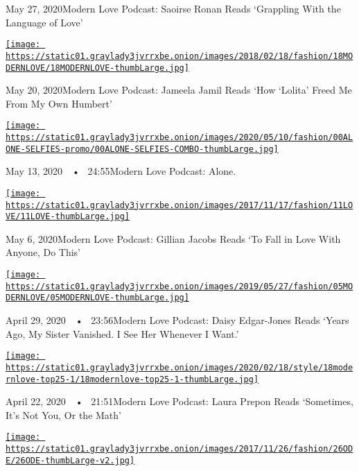 May 27, 2020Modern Love Podcast: Saoirse Ronan Reads `Grappling With the
Language of Love'

\href{https://www.nytimes3xbfgragh.onion/2020/05/20/style/modern-love-podcast-jameela-jamil.html?action=click\&module=audio-series-bar\&region=header\&pgtype=Article}{\texttt{[image: https://static01.graylady3jvrrxbe.onion/images/2018/02/18/fashion/18MODERNLOVE/18MODERNLOVE-thumbLarge.jpg]}}

May 20, 2020Modern Love Podcast: Jameela Jamil Reads `How `Lolita' Freed
Me From My Own Humbert'

\href{https://www.nytimes3xbfgragh.onion/2020/05/13/style/modern-love-podcast-coronavirus-living-alone.html?action=click\&module=audio-series-bar\&region=header\&pgtype=Article}{\texttt{[image: https://static01.graylady3jvrrxbe.onion/images/2020/05/10/fashion/00ALONE-SELFIES-promo/00ALONE-SELFIES-COMBO-thumbLarge.jpg]}}

May 13, 2020~~•~ 24:55Modern Love Podcast: Alone.

\href{https://www.nytimes3xbfgragh.onion/2020/05/06/style/modern-love-podcast-gillian-jacobs.html?action=click\&module=audio-series-bar\&region=header\&pgtype=Article}{\texttt{[image: https://static01.graylady3jvrrxbe.onion/images/2017/11/17/fashion/11LOVE/11LOVE-thumbLarge.jpg]}}

May 6, 2020Modern Love Podcast: Gillian Jacobs Reads `To Fall in Love
With Anyone, Do This'

\href{https://www.nytimes3xbfgragh.onion/2020/04/29/style/modern-love-podcast-daisy-edgar-jones.html?action=click\&module=audio-series-bar\&region=header\&pgtype=Article}{\texttt{[image: https://static01.graylady3jvrrxbe.onion/images/2019/05/27/fashion/05MODERNLOVE/05MODERNLOVE-thumbLarge.jpg]}}

April 29, 2020~~•~ 23:56Modern Love Podcast: Daisy Edgar-Jones Reads
`Years Ago, My Sister Vanished. I See Her Whenever I Want.'

\href{https://www.nytimes3xbfgragh.onion/2020/04/22/style/modern-love-podcast-laura-prepon.html?action=click\&module=audio-series-bar\&region=header\&pgtype=Article}{\texttt{[image: https://static01.graylady3jvrrxbe.onion/images/2020/02/18/style/18modernlove-top25-1/18modernlove-top25-1-thumbLarge.jpg]}}

April 22, 2020~~•~ 21:51Modern Love Podcast: Laura Prepon Reads
`Sometimes, It's Not You, Or the Math'

\href{https://www.nytimes3xbfgragh.onion/2020/04/15/style/modern-love-podcast-coronavirus.html?action=click\&module=audio-series-bar\&region=header\&pgtype=Article}{\texttt{[image: https://static01.graylady3jvrrxbe.onion/images/2017/11/26/fashion/26ODE/26ODE-thumbLarge-v2.jpg]}}

